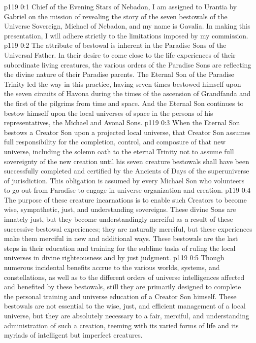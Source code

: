 \author{Chief of Evening Stars}
\vs p119 0:1 Chief of the Evening Stars of Nebadon, I am assigned to Urantia by Gabriel on the mission of revealing the story of the seven bestowals of the Universe Sovereign, Michael of Nebadon, and my name is Gavalia. In making this presentation, I will adhere strictly to the limitations imposed by my commission.
\pc \vs p119 0:2 The attribute of bestowal is inherent in the Paradise Sons of the Universal Father. In their desire to come close to the life experiences of their subordinate living creatures, the various orders of the Paradise Sons are reflecting the divine nature of their Paradise parents. The Eternal Son of the Paradise Trinity led the way in this practice, having seven times bestowed himself upon the seven circuits of Havona during the times of the ascension of Grandfanda and the first of the pilgrims from time and space. And the Eternal Son continues to bestow himself upon the local universes of space in the persons of his representatives, the Michael and Avonal Sons.
\vs p119 0:3 When the Eternal Son bestows a Creator Son upon a projected local universe, that Creator Son assumes full responsibility for the completion, control, and composure of that new universe, including the solemn oath to the eternal Trinity not to assume full sovereignty of the new creation until his seven creature bestowals shall have been successfully completed and certified by the Ancients of Days of the superuniverse of jurisdiction. This obligation is assumed by every Michael Son who volunteers to go out from Paradise to engage in universe organization and creation.
\vs p119 0:4 The purpose of these creature incarnations is to enable such Creators to become wise, sympathetic, just, and understanding sovereigns. These divine Sons are innately just, but they become understandingly merciful as a result of these successive bestowal experiences; they are naturally merciful, but these experiences make them merciful in new and additional ways. These bestowals are the last steps in their education and training for the sublime tasks of ruling the local universes in divine righteousness and by just judgment.
\vs p119 0:5 Though numerous incidental benefits accrue to the various worlds, systems, and constellations, as well as to the different orders of universe intelligences affected and benefited by these bestowals, still they are primarily designed to complete the personal training and universe education of a Creator Son himself. These bestowals are not essential to the wise, just, and efficient management of a local universe, but they are absolutely necessary to a fair, merciful, and understanding administration of such a creation, teeming with its varied forms of life and its myriads of intelligent but imperfect creatures.
